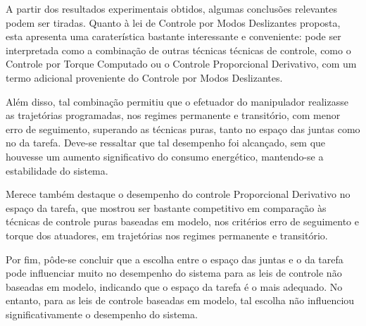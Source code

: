 \documentclass[]{politex}
\begin{document}



A partir dos resultados experimentais obtidos, algumas conclusões relevantes podem ser tiradas. Quanto à lei de Controle por Modos Deslizantes proposta, esta apresenta uma caraterística bastante interessante e conveniente: pode ser interpretada como a combinação de outras técnicas técnicas de controle, como o Controle por Torque Computado ou o Controle Proporcional Derivativo, com um termo adicional proveniente do Controle por Modos Deslizantes. 

Além disso, tal combinação permitiu que o efetuador do manipulador realizasse as trajetórias programadas, nos regimes permanente e transitório, com menor erro de seguimento, superando as técnicas puras, tanto no espaço das juntas como no da tarefa. Deve-se ressaltar que tal desempenho foi alcançado, sem que houvesse um aumento significativo do consumo energético, mantendo-se a estabilidade do sistema.

Merece também destaque o desempenho do controle Proporcional Derivativo no espaço da tarefa, que mostrou ser bastante competitivo em comparação às técnicas de controle puras baseadas em modelo, nos critérios erro de seguimento e torque dos atuadores, em trajetórias nos regimes permanente e transitório. 

Por fim, pôde-se concluir que a escolha entre o espaço das juntas e o da tarefa pode influenciar muito no desempenho do sistema para as leis de controle não baseadas em modelo, indicando que o espaço da tarefa é o mais adequado. No entanto, para as leis de controle baseadas em modelo, tal escolha não influenciou significativamente o desempenho do sistema.
\end{document}
